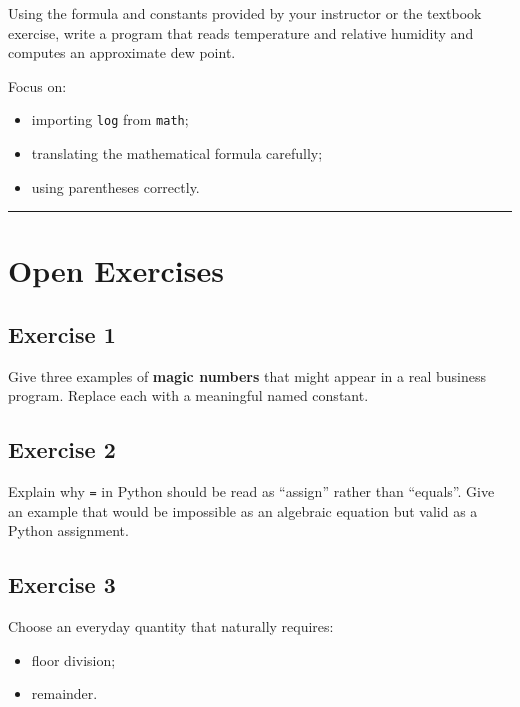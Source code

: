 \documentclass[
]{article}
\providecommand{\tightlist}{%
  \setlength{\itemsep}{0pt}\setlength{\parskip}{0pt}}
\begin{document}
Using the formula and constants provided by your instructor or the
textbook exercise, write a program that reads temperature and relative
humidity and computes an approximate dew point.

Focus on:

\begin{itemize}
\tightlist
\item
  importing \texttt{log} from \texttt{math};
\item
  translating the mathematical formula carefully;
\item
  using parentheses correctly.
\end{itemize}

\begin{center}\rule{0.5\linewidth}{0.5pt}\end{center}

\section{Open Exercises}\label{open-exercises}

\subsection{Exercise 1}\label{exercise-1}

Give three examples of \textbf{magic numbers} that might appear in a
real business program. Replace each with a meaningful named constant.

\subsection{Exercise 2}\label{exercise-2}

Explain why \texttt{=} in Python should be read as ``assign'' rather
than ``equals''. Give an example that would be impossible as an
algebraic equation but valid as a Python assignment.

\subsection{Exercise 3}\label{exercise-3}

Choose an everyday quantity that naturally requires:

\begin{itemize}
\tightlist
\item
  floor division;
\item
  remainder.
\end{itemize}
\end{document}
